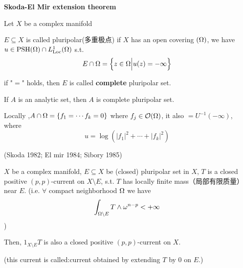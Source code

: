 \textbf{Skoda-El Mir extension theorem}

Let $X$ be a complex manifold

\begin{definition}
$E\subseteq X$ is called pluripolar(多重极点) if
$X$ has an open covering $(\Omega)$, we have
$u\in\operatorname{PSH}(\Omega)\cap L^1_{\operatorname{Loc}}(\Omega)$ s.t.
$$E\cap\Omega=\Big\{ z\in\Omega \Big| u(z)=-\infty \Big\}$$
\end{definition}

if "$=$" holds, then $E$ is called \textbf{complete} pluripolar set.

\begin{example}
If $A$ is an analytic set, then $A$ is complete pluripolar set.
\end{example}

Locally ,$A\cap\Omega=\{f_1=\cdots f_k=0\}$ where $f_j\in\mathcal{O}(\Omega)$,
it also $= U^{-1}(-\infty)$, where
$$u=\log(|f_1|^2+\cdots+|f_k|^2)$$

\begin{thm}(Skoda 1982; El mir 1984; Sibory 1985)

$X$ be a complex manifold, $E\subseteq X$ be (closed) pluripolar set in $X$,
$T$ is a closed positive $(p,p)$-current on $X\setminus E$,
s.t. $T$ has locally finite mass（局部有限质量） near $E$.
(i.e. $\forall$ compact neighborhood $\Omega$ we have
$$\int_{\Omega\setminus E}T\wedge\omega^{n-p}<+\infty$$
)

Then, $1_{X\setminus E}T$ is also a closed positive $(p,p)$-current on $X$.
\end{thm}
(this current is called:current obtained by extending $T$ by $0$ on $E$.)

